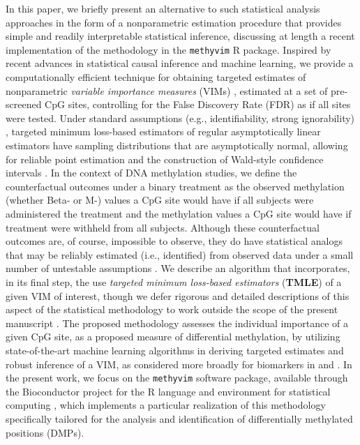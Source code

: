 \documentclass[9pt,a4paper,]{extarticle}
\theoremstyle{definition}
\theoremstyle{definition}
\theoremstyle{definition}
\theoremstyle{remark}
\begin{document}
In this paper, we briefly present an alternative to such statistical analysis
approaches in the form of a nonparametric estimation procedure that provides
simple and readily interpretable statistical inference, discussing at length a
recent implementation of the methodology in the \texttt{methyvim} R package. Inspired
by recent advances in statistical causal inference and machine learning, we
provide a computationally efficient technique for obtaining targeted estimates
of nonparametric \emph{variable importance measures} (VIMs) \citep{vdl2006statistical},
estimated at a set of pre-screened CpG sites, controlling for the False
Discovery Rate (FDR) as if all sites were tested. Under standard assumptions
(e.g., identifiability, strong ignorability) \citep{pearl2009causality}, targeted
minimum loss-based estimators of regular asymptotically linear estimators have
sampling distributions that are asymptotically normal, allowing for reliable
point estimation and the construction of Wald-style confidence intervals
\citep[\citet{vdl2018targeted}]{vdl2011targeted}. In the context of DNA methylation studies,
we define the counterfactual outcomes under a binary treatment as the observed
methylation (whether Beta- or M-) values a CpG site would have if all subjects
were administered the treatment and the methylation values a CpG site would have
if treatment were withheld from all subjects. Although these counterfactual
outcomes are, of course, impossible to observe, they do have statistical analogs
that may be reliably estimated (i.e., identified) from observed data under a
small number of untestable assumptions \citep{pearl2009causality}. We describe an
algorithm that incorporates, in its final step, the use \emph{targeted minimum
loss-based estimators} (\textbf{TMLE}) \citep{vdl2006targeted} of a given VIM of interest,
though we defer rigorous and detailed descriptions of this aspect of the
statistical methodology to work outside the scope of the present manuscript
\citep[\citet{vdl2011targeted}, \citet{vdl2018targeted}]{vdl2006targeted}. The proposed methodology
assesses the individual importance of a given CpG site, as a proposed measure of
differential methylation, by utilizing state-of-the-art machine learning
algorithms in deriving targeted estimates and robust inference of a VIM, as
considered more broadly for biomarkers in \citet{bembom2009biomarker} and
\citet{tuglus2011targeted}. In the present work, we focus on the \texttt{methyvim} software
package, available through the Bioconductor project \citep[
\citet{huber2015orchestrating}]{gentleman2004bioconductor} for the R language and environment for statistical
computing \citep{R}, which implements a particular realization of this methodology
specifically tailored for the analysis and identification of differentially
methylated positions (DMPs).
\end{document}
